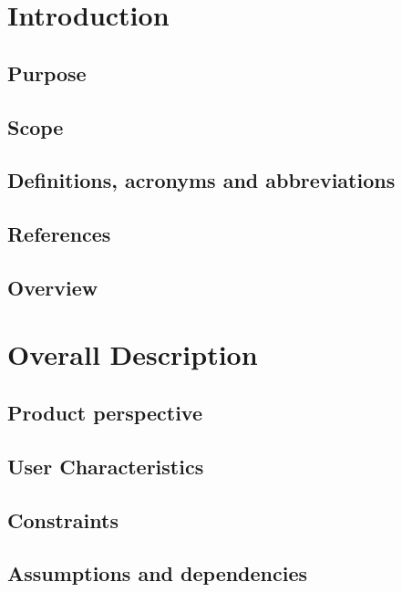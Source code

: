 


    
  \begin{titlepage}
    
  \end{titlepage}
  
  \tableofcontents
   
  \chapter{Introduction}
  \section{Purpose}
  
  \section{Scope}
  
  \section{Definitions, acronyms and abbreviations}
  
  \section{References}
  
  \section{Overview}
  
  
  \chapter{Overall Description}
  \section{Product perspective}
  
  \section{User Characteristics}
  
  \section{Constraints}
  
  \section{Assumptions and dependencies}
  
  


  

